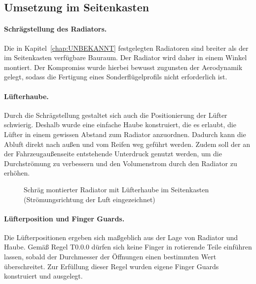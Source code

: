 \subsection{Umsetzung im Seitenkasten}
\label{subsec:umsetzung_seitenkasten}

\paragraph{Schrägstellung des Radiators.}
Die in Kapitel~\ref{chap:UNBEKANNT} festgelegten Radiatoren sind
breiter als der im Seitenkasten verfügbare Bauraum. Der Radiator wird daher
in einem Winkel montiert. Der Kompromiss wurde hierbei bewusst zugunsten der
Aerodynamik gelegt, sodass die Fertigung eines Sonderflügelprofils nicht
erforderlich ist.

\paragraph{Lüfterhaube.}
Durch die Schrägstellung gestaltet sich auch die Positionierung der Lüfter
schwierig. Deshalb wurde eine einfache Haube konstruiert, die es erlaubt, die
Lüfter in einem gewissen Abstand zum Radiator anzuordnen. Dadurch kann die
Abluft direkt nach außen und vom Reifen weg geführt werden. Zudem soll der
an der Fahrzeugaußenseite entstehende Unterdruck genutzt werden, um die
Durchströmung zu verbessern und den Volumenstrom durch den Radiator zu
erhöhen.

\begin{figure}[htbp]
    \centering
    \caption{Schräg montierter Radiator mit Lüfterhaube im Seitenkasten
             (Strömungsrichtung der Luft eingezeichnet)}
    \label{fig:radiator_luefterhaube}
\end{figure}

\paragraph{Lüfterposition und Finger Guards.}
Die Lüfterpositionen ergeben sich maßgeblich aus der Lage von Radiator und
Haube. Gemäß Regel T0.0.0 dürfen sich keine Finger in rotierende
Teile einführen lassen, sobald der Durchmesser der Öffnungen einen
bestimmten Wert überschreitet. Zur Erfüllung dieser Regel wurden eigene
Finger Guards konstruiert und ausgelegt.

